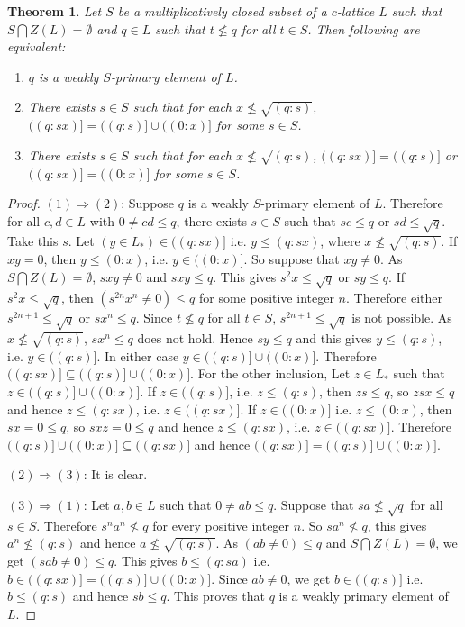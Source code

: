 \documentclass[10pt,twoside,a4paper]{amsart}
\numberwithin{equation}{section}
\theoremstyle{plain}
\newtheorem{thm}[lem]{Theorem}
\theoremstyle{definition}
\begin{document}
\begin{thm}
	Let $S$ be a multiplicatively closed subset of a $c$-lattice $L$ such that $S\bigcap Z(L)=\emptyset$ and $q \in L$ such that $t \nleq q$ for all $t \in S$. Then following are equivalent:
	
	\begin{enumerate}
		\item $q$ is a weakly $S$-primary element of $L$.
		
		\item There exists $s \in S$ such that for each $x \nleq \sqrt{(q:s)}$, $((q:sx)] = ((q:s)] \cup ((0:x)]$ for some $s \in S$.
		
		\item There exists $s \in S$ such that for each $x \nleq \sqrt{(q:s)}$, $((q:sx)] = ((q:s)]$ or $((q:sx)] = ((0:x)]$ for some $s \in S$.
	\end{enumerate} 
\end{thm}
\begin{proof}
	$(1) \Rightarrow (2)$:  Suppose $q$ is a weakly $S$-primary element of $L$. Therefore for all $c,d \in L$ with $0 \neq cd \leq q$, there exists $s \in S$ such that $sc \leq q$   or $sd \leq \sqrt{q}$. Take this $s$. Let $(y \in L_*) \in ((q:sx)]$ i.e. $y\leq (q:sx)$, where $x \nleq \sqrt{(q:s)}$. If $xy =0$, then $y \leq (0:x)$, i.e. $y \in ((0:x)]$. So suppose that $xy \neq 0$. As $S\bigcap Z(L)=\emptyset$, $sxy \neq 0$ and $sxy \leq q$. This gives $s^2 x \leq \sqrt{q}$ or  $sy \leq q$. If $s^2 x \leq \sqrt{q}$, then $(s^{2n} x^n \neq 0) \leq q$ for some positive integer $n$. Therefore either $s^{2n+1} \leq \sqrt{q}$ or $sx^n \leq q$. Since  $t \nleq q$ for all $t \in S$,  $s^{2n+1} \leq \sqrt{q}$ is not possible. As  $x \nleq \sqrt{(q:s)}$, $sx^n \leq q$ does not hold. Hence $sy \leq q$ and this gives $y \leq (q:s)$, i.e. $y \in ((q:s)]$. In either case $y\in ((q:s)] \cup ((0:x) ]$. Therefore $((q:sx)] \subseteq ((q:s)] \cup ((0:x)]$. For the other inclusion, Let $z \in L_*$ such that $z \in ((q:s)] \cup ((0:x)]$. If $z \in ((q:s)] $, i.e. $z \leq (q:s)$, then $zs\leq q$, so $zsx\leq q$ and hence $z \leq (q:sx)$, i.e. $z \in ((q:sx)]$. If $z \in  ((0:x)]$ i.e. $z \leq  (0:x)$, then $sx =0 \leq q$, so $sxz =0 \leq q$ and hence $z \leq (q:sx)$, i.e. $z \in ((q:sx)]$. Therefore $((q:s)] \cup ((0:x)] \subseteq ((q:sx)]$ and hence $((q:sx)] = ((q:s)] \cup ((0:x)]$. 
	
	$(2) \Rightarrow (3)$: It is clear.
	
	$(3) \Rightarrow (1)$: Let $a,b \in L$ such that $0 \neq ab \leq q$. Suppose that $sa \nleq \sqrt{q}$ for all $s \in S$. Therefore $s^n a^n \nleq q$ for every positive integer $n$. So $s a^n \nleq q$, this gives $a^n \nleq (q:s)$ and hence $a \nleq \sqrt{(q:s)}$. As $(ab \neq 0) \leq q$ and  $S\bigcap Z(L)=\emptyset$, we get $(sab \neq 0) \leq q$. This gives $b \leq (q:sa)$ i.e.$ b \in ((q:sx)] = ((q:s)] \cup ((0:x)]$. Since $ab \neq 0$, we get $b \in ((q:s)]$ i.e. $b \leq (q:s)$ and hence $sb \leq q$. This proves that $q$ is a weakly primary element of $L$. 
\end{proof}
\end{document}
